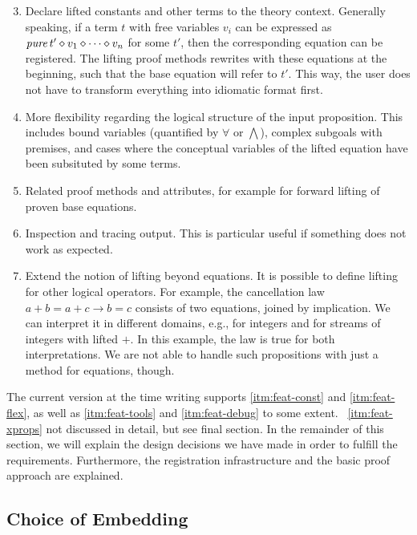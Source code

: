 \begin{enumerate}
\setcounter{enumi}{2}
\item\label{itm:feat-const}
	Declare lifted constants and other terms to the theory context.
	Generally speaking, if a term $t$ with free variables $v_i$ can be expressed
	as $\operatorname{\mathit{pure}} t' \diamond v_1 \diamond \cdots \diamond v_n$ for some $t'$, then the
	corresponding equation can be registered.
	The lifting proof methods rewrites with these equations at the beginning,
	such that the base equation will refer to $t'$.
	This way, the user does not have to transform everything into idiomatic
	format first.
\item\label{itm:feat-flex}
	More flexibility regarding the logical structure of the input proposition.
	This includes bound variables (quantified by $\forall$ or $\bigwedge$),
	complex subgoals with premises, and cases where the conceptual variables
	of the lifted equation have been subsituted by some terms.
\item\label{itm:feat-tools}
	Related proof methods and attributes, for example for forward lifting
	of proven base equations.
\item\label{itm:feat-debug}
	Inspection and tracing output.
	This is particular useful if something does not work as expected.
\item\label{itm:feat-xprops}
	Extend the notion of lifting beyond equations.
	It is possible to define lifting for other logical operators.
	For example, the cancellation law $a + b = a + c \longrightarrow b = c$
	consists of two equations, joined by implication.
	We can interpret it in different domains, e.g., for integers and for
	streams of integers with lifted $+$.
	In this example, the law is true for both interpretations.
	We are not able to handle such propositions with just a method for
	equations, though.
\end{enumerate}

The current version at the time writing supports \ref{itm:feat-const} and
\ref{itm:feat-flex}, as well as \ref{itm:feat-tools} and \ref{itm:feat-debug}
to some extent.
\todo\ \ref{itm:feat-xprops} not discussed in detail, but see final section. %
In the remainder of this section, we will explain the design decisions we
have made in order to fulfill the requirements.
Furthermore, the registration infrastructure and the basic proof approach are
explained.


\subsection{Choice of Embedding}\label{subsec:embedding}

